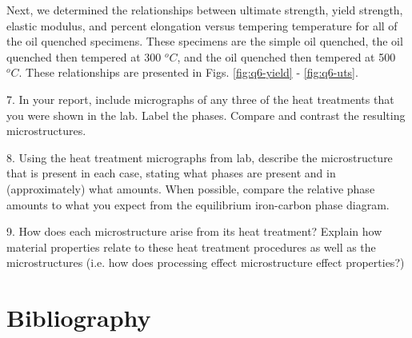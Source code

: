 \documentclass{article}
\begin{document}
Next, we determined the relationships between ultimate strength, yield strength, elastic modulus, and percent elongation versus tempering temperature for all of the oil quenched specimens. These specimens are the simple oil quenched, the oil quenched then tempered at 300 $^oC$, and the oil quenched then tempered at 500 $^oC$. These relationships are presented in Figs. \ref{fig:q6-yield} - \ref{fig:q6-uts}.



7. In your report, include micrographs of any three of the heat treatments that you were shown in the lab.
Label the phases. Compare and contrast the resulting microstructures.




8. Using the heat treatment micrographs from lab, describe the microstructure that is present in each case,
stating what phases are present and in (approximately) what amounts. When possible, compare the
relative phase amounts to what you expect from the equilibrium iron-carbon phase diagram.




9. How does each microstructure arise from its heat treatment? Explain how material properties relate to
these heat treatment procedures as well as the microstructures (i.e. how does processing effect
microstructure effect properties?)




\section{Bibliography}
\end{document}
